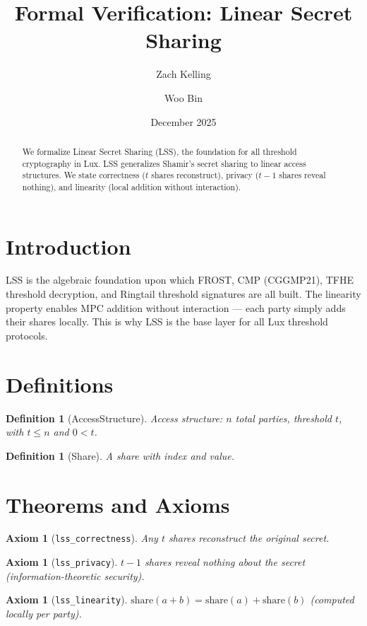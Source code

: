 \documentclass[11pt]{article}
\title{Formal Verification: Linear Secret Sharing}
\author{Zach Kelling \and Woo Bin}
\date{December 2025}
\newtheorem{definition}[theorem]{Definition}
\newtheorem{axiom_stmt}[theorem]{Axiom}
\begin{document}
\maketitle

\begin{abstract}
We formalize Linear Secret Sharing (LSS), the foundation for all threshold cryptography in Lux. LSS generalizes Shamir's secret sharing to linear access structures. We state correctness ($t$ shares reconstruct), privacy ($t-1$ shares reveal nothing), and linearity (local addition without interaction).
\end{abstract}

\section{Introduction}
LSS is the algebraic foundation upon which FROST, CMP (CGGMP21), TFHE threshold decryption, and Ringtail threshold signatures are all built. The linearity property enables MPC addition without interaction --- each party simply adds their shares locally. This is why LSS is the base layer for all Lux threshold protocols.

\section{Definitions}
\begin{definition}[AccessStructure]
Access structure: $n$ total parties, threshold $t$, with $t \leq n$ and $0 < t$.
\end{definition}

\begin{definition}[Share]
A share with index and value.
\end{definition}


\section{Theorems and Axioms}
\begin{axiom_stmt}[\texttt{lss\_correctness}]
Any $t$ shares reconstruct the original secret.
\end{axiom_stmt}

\begin{axiom_stmt}[\texttt{lss\_privacy}]
$t-1$ shares reveal nothing about the secret (information-theoretic security).
\end{axiom_stmt}

\begin{axiom_stmt}[\texttt{lss\_linearity}]
$\text{share}(a+b) = \text{share}(a) + \text{share}(b)$ (computed locally per party).
\end{axiom_stmt}
\end{document}
